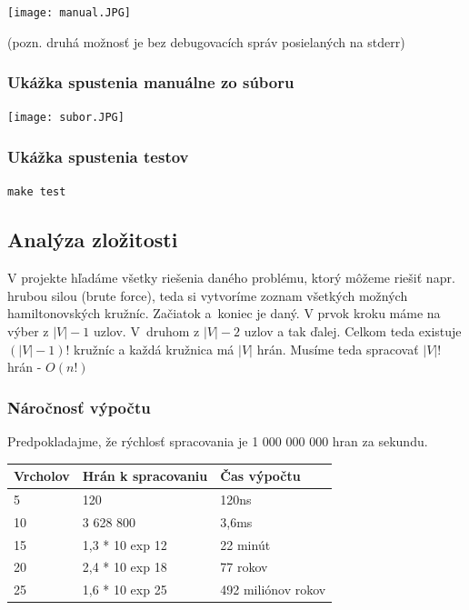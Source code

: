 \documentclass[a4paper,11pt, titlepage]{article}
\begin{document}
\texttt{[image: manual.JPG]}

(pozn. druhá možnosť je bez debugovacích správ posielaných na stderr)

\subsubsection{Ukážka spustenia manuálne zo súboru}

\texttt{[image: subor.JPG]}

\subsubsection{Ukážka spustenia testov}

\texttt{make test}

\subsection{Analýza zložitosti}

V projekte hľadáme všetky riešenia daného problému, ktorý môžeme riešiť napr. hrubou silou (brute force), teda si vytvoríme zoznam všetkých možných hamiltonovských kružníc. Začiatok a~koniec je daný. V prvok kroku máme na výber z $|V| - 1$ uzlov. V~druhom z $|V| -2$ uzlov a tak ďalej. Celkom teda existuje $(|V| - 1)!$ kružníc a každá kružnica má $|V|$ hrán. Musíme teda spracovať $|V|!$ hrán - $O(n!)$

\subsubsection{Náročnosť výpočtu}

Predpokladajme, že rýchlosť spracovania je 1 000 000 000 hran za sekundu.

\begin{table}[h]
\centering
\begin{tabular}{|l|l|l|}
\hline
Vrcholov & Hrán k spracovaniu & Čas výpočtu        \\ \hline
5        & 120                & 120ns              \\ \hline
10       & 3 628 800          & 3,6ms              \\ \hline
15       & 1,3 * 10 exp 12    & 22 minút           \\ \hline
20       & 2,4 * 10 exp 18    & 77 rokov           \\ \hline
25       & 1,6 * 10 exp 25    & 492 miliónov rokov \\ \hline
\end{tabular}
\end{table}
\end{document}
